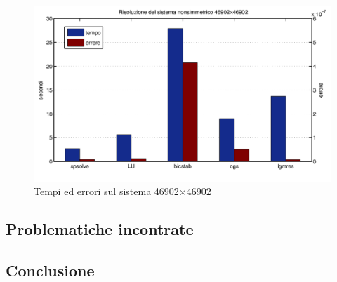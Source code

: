 \documentclass[11pt,a4paper]{scrartcl}
\begin{document}
\begin{figure}[!ht]
\centering
\includegraphics[scale=0.50]{images/confronto} 
\caption{Tempi ed errori sul sistema 46902$\times$46902}
\label{confronto}
\end{figure}

\subsection*{Problematiche incontrate}

\subsection*{Conclusione}
\end{document}
